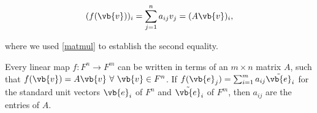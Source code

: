 \documentclass[a4paper,12pt]{report}
\begin{document}
\begin{equation}
    (f(\vb{v} ))_{i} = \sum_{j=1}^{n} a_{ij} v_{j} = (A\vb{v} )_{i},  
\end{equation}

where we used \cref{matmul} to establish the second equality.

\begin{lemma}\label{matrixlinearmap} 
Every linear map \(f: F^{n} \rightarrow F^{m}  \) can be written in terms of an \(m \times  n\) matrix \(A\), such that \(f(\vb{v} ) = A\vb{v} ~\forall ~ \vb{v} \in F^{n} \). If \(f(\vb{e} _{j} ) = \sum_{i=1}^{m} a_{ij} \tilde{\vb{e} } _{i} \) for the standard unit vectors \(\vb{e} _{i} \) of \(F^{n} \) and \(\tilde{\vb{e} } _{i} \) of \(F^{m} \), then \(a_{ij} \) are the entries of \(A\).         
\end{lemma}
\end{document}
